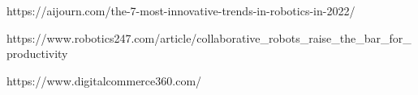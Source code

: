 \documentclass{report}
\begin{document}
\begin{thebibliography}{99}

https://aijourn.com/the-7-most-innovative-trends-in-robotics-in-2022/

https://www.robotics247.com/article/collaborative\_robots\_raise\_the\_bar\_for\_productivity

https://www.digitalcommerce360.com/

\end{thebibliography}
\end{document}
